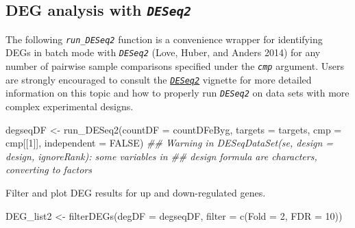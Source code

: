\documentclass[14pt,]{article}
\newcommand{\hlnum}[1]{\textcolor[rgb]{0.816,0.125,0.439}{#1}}%
\newcommand{\hlcom}[1]{\textcolor[rgb]{0.502,0.502,0.502}{\textit{#1}}}%
\newcommand{\hlstd}[1]{\textcolor[rgb]{0.251,0.251,0.251}{#1}}%
\newenvironment{Shaded}{\begin{myshaded}}{\end{myshaded}}
\newcommand{\DecValTok}[1]{\hlnum{#1}}
\newcommand{\ConstantTok}[1]{\hlnum{#1}}
\newcommand{\DocumentationTok}[1]{\hlcom{#1}}
\newcommand{\OtherTok}[1]{{#1}}
\newcommand{\FunctionTok}[1]{\hlstd{#1}}
\newcommand{\AttributeTok}[1]{{#1}}
\newcommand{\NormalTok}[1]{\hlstd{#1}}
\begin{document}
\hypertarget{deg-analysis-with-deseq2}{%
\subsection{\texorpdfstring{DEG analysis with \emph{\texttt{DESeq2}}}{DEG analysis with DESeq2}}\label{deg-analysis-with-deseq2}}

The following \emph{\texttt{run\_DESeq2}} function is a convenience wrapper for
identifying DEGs in batch mode with \emph{\texttt{DESeq2}} (Love, Huber, and Anders 2014) for any number of
pairwise sample comparisons specified under the \emph{\texttt{cmp}} argument. Users
are strongly encouraged to consult the
\href{http://www.bioconductor.org/packages/devel/bioc/vignettes/DESeq2/inst/doc/DESeq2.pdf}{\emph{\texttt{DESeq2}}} vignette
for more detailed information on this topic and how to properly run \emph{\texttt{DESeq2}}
on data sets with more complex experimental designs.

\begin{Shaded}
\begin{Highlighting}[]
\NormalTok{degseqDF }\OtherTok{\textless{}{-}} \FunctionTok{run\_DESeq2}\NormalTok{(}\AttributeTok{countDF =}\NormalTok{ countDFeByg, }\AttributeTok{targets =}\NormalTok{ targets, }\AttributeTok{cmp =}\NormalTok{ cmp[[}\DecValTok{1}\NormalTok{]], }
    \AttributeTok{independent =} \ConstantTok{FALSE}\NormalTok{)}
\DocumentationTok{\#\# Warning in DESeqDataSet(se, design = design, ignoreRank): some variables in}
\DocumentationTok{\#\# design formula are characters, converting to factors}
\end{Highlighting}
\end{Shaded}

Filter and plot DEG results for up and down-regulated genes.

\begin{Shaded}
\begin{Highlighting}[]
\NormalTok{DEG\_list2 }\OtherTok{\textless{}{-}} \FunctionTok{filterDEGs}\NormalTok{(}\AttributeTok{degDF =}\NormalTok{ degseqDF, }\AttributeTok{filter =} \FunctionTok{c}\NormalTok{(}\AttributeTok{Fold =} \DecValTok{2}\NormalTok{, }\AttributeTok{FDR =} \DecValTok{10}\NormalTok{))}
\end{Highlighting}
\end{Shaded}
\end{document}
